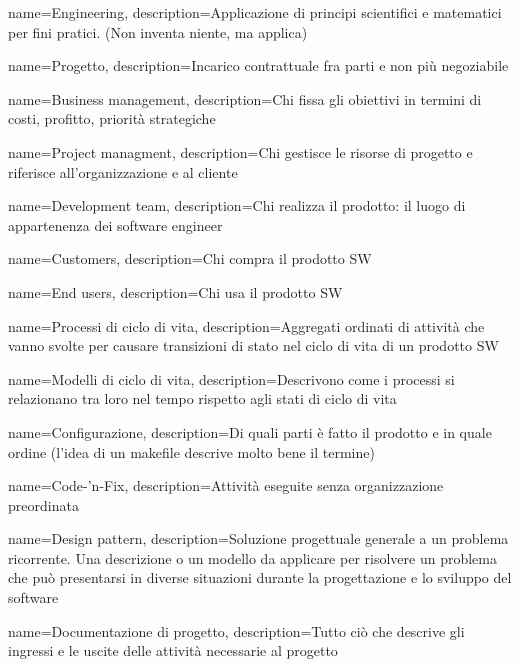 {
  name=Engineering,
  description={Applicazione di principi scientifici e matematici per fini pratici. (Non inventa niente, ma applica)}
}

{
  name=Progetto,
  description={Incarico contrattuale fra parti e non più negoziabile}
}

{
  name=Business management,
  description={Chi fissa gli obiettivi in termini di costi, profitto, priorità strategiche}
}

{
  name=Project managment,
  description={Chi gestisce le risorse di progetto e riferisce all'organizzazione e al cliente}
}

{
  name=Development team,
  description={Chi realizza il prodotto: il luogo di appartenenza dei software engineer}
}

{
  name=Customers,
  description={Chi compra il prodotto SW}
}

{
  name=End users,
  description={Chi usa il prodotto SW}
}

{
  name=Processi di ciclo di vita,
  description={Aggregati ordinati di attività che vanno svolte per causare transizioni di stato nel ciclo di vita di un prodotto SW}
}

{
  name=Modelli di ciclo di vita,
  description={Descrivono come i processi si relazionano tra loro nel tempo rispetto agli stati di ciclo di vita}
}

{
  name=Configurazione,
  description={Di quali parti è fatto il prodotto e in quale ordine (l'idea di un makefile descrive molto bene il termine)}
}

{
  name=Code-'n-Fix,
  description={Attività eseguite senza organizzazione preordinata}
}

{
  name=Design pattern,
  description={Soluzione progettuale generale a un problema ricorrente. Una descrizione o un modello da applicare per risolvere un problema che può presentarsi in diverse situazioni durante la progettazione e lo sviluppo del software}
 }
 
{
  name=Documentazione di progetto,
  description={Tutto ciò che descrive gli ingressi e le uscite delle attività necessarie al progetto}
}

